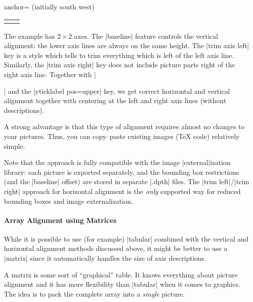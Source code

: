 \begin{pgfplotskey}{anchor= (initially south west)}
\begin{minipage}
\begin{tabular}
\begin{codeexample}[vbox]
\begin{center}
\begin{tabular}{rl}
\begin{tikzpicture}[baseline,trim axis right]
    \end{tikzpicture}
        \\
\end{tabular}
\end{center}
\end{codeexample}
    \noindent The example has $2 \times 2$ axes. The |baseline| feature
    controls the vertical alignment: the lower axis lines are always on the
    same height. The |trim axis left| key is a style which tells \Tikz{} to
    trim everything which is left of the left axis line. Similarly, the
    |trim axis right| key does not include picture parts right of the right
    axis line. Together with |\begin{center}| and the |yticklabel pos=upper|
    key, we get correct horizontal and vertical alignment together with
    centering at the left and right axis lines (without descriptions).

    A strong advantage is that this type of alignment requires almost no
    changes to your pictures. Thus, you can copy--paste existing images (\TeX{}
    code) relatively simple.

    Note that the approach is fully compatible with the image |external|ization
    library: each picture is exported separately, and the bounding box
    restrictions (and the |baseline| offset) are stored in separate |.dpth|
    files. The |trim left|/|trim right| approach for horizontal alignment is
    the \emph{only} supported way for reduced bounding boxes and image
    externalization.


    \paragraph{Array Alignment using \Tikz{} Matrices}

    While it is possible to use (for example) |tabular| combined with the
    vertical and horizontal alignment methods discussed above, it might be
    better to use a \Tikz{} |matrix| since it automatically handles the size of
    axis descriptions.

    A \Tikz{} matrix is some sort of ``graphical'' table. It knows everything
    about picture alignment and it has more flexibility than |tabular| when it
    comes to graphics. The idea is to pack the complete array into a
    \emph{single} picture.


\end{center}
\end{tabular}
\end{minipage}
\end{pgfplotskey}
